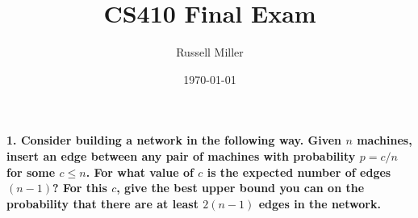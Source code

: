 \documentclass{article}
\title{CS410 Final Exam}
\author{Russell Miller}
\date{\today}
\begin{document}
\maketitle

\paragraph{1. Consider building a network in the following way. Given $n$ machines, insert an edge between any pair of machines with probability $p = c/n$ for some $c \leq n$. For what value of $c$ is the expected number of edges $(n - 1)$? For this $c$, give the best upper bound you can on the probability that there are at least $2(n - 1)$ edges in the network.}
\end{document}
